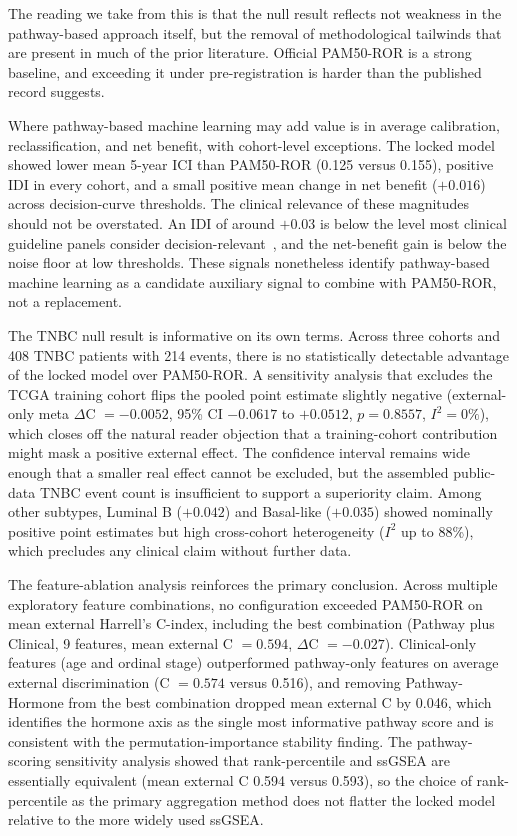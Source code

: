 \documentclass[11pt,letterpaper]{article}
\begin{document}
The reading we take from this is that the null result reflects not weakness in the pathway-based approach itself, but the removal of methodological tailwinds that are present in much of the prior literature. Official PAM50-ROR is a strong baseline, and exceeding it under pre-registration is harder than the published record suggests.

Where pathway-based machine learning may add value is in average calibration, reclassification, and net benefit, with cohort-level exceptions. The locked model showed lower mean 5-year ICI than PAM50-ROR (0.125 versus 0.155), positive IDI in every cohort, and a small positive mean change in net benefit ($+0.016$) across decision-curve thresholds. The clinical relevance of these magnitudes should not be overstated. An IDI of around $+0.03$ is below the level most clinical guideline panels consider decision-relevant~\cite{vickers2010traditional}, and the net-benefit gain is below the noise floor at low thresholds. These signals nonetheless identify pathway-based machine learning as a candidate auxiliary signal to combine with PAM50-ROR, not a replacement.

The TNBC null result is informative on its own terms. Across three cohorts and 408 TNBC patients with 214 events, there is no statistically detectable advantage of the locked model over PAM50-ROR. A sensitivity analysis that excludes the TCGA training cohort flips the pooled point estimate slightly negative (external-only meta $\Delta$C $= -0.0052$, 95\% CI $-0.0617$ to $+0.0512$, $p = 0.8557$, $I^2 = 0\%$), which closes off the natural reader objection that a training-cohort contribution might mask a positive external effect. The confidence interval remains wide enough that a smaller real effect cannot be excluded, but the assembled public-data TNBC event count is insufficient to support a superiority claim. Among other subtypes, Luminal B ($+0.042$) and Basal-like ($+0.035$) showed nominally positive point estimates but high cross-cohort heterogeneity ($I^2$ up to 88\%), which precludes any clinical claim without further data.

The feature-ablation analysis reinforces the primary conclusion. Across multiple exploratory feature combinations, no configuration exceeded PAM50-ROR on mean external Harrell's C-index, including the best combination (Pathway plus Clinical, 9 features, mean external C $= 0.594$, $\Delta$C $= -0.027$). Clinical-only features (age and ordinal stage) outperformed pathway-only features on average external discrimination (C $= 0.574$ versus 0.516), and removing Pathway-Hormone from the best combination dropped mean external C by 0.046, which identifies the hormone axis as the single most informative pathway score and is consistent with the permutation-importance stability finding. The pathway-scoring sensitivity analysis showed that rank-percentile and ssGSEA are essentially equivalent (mean external C 0.594 versus 0.593), so the choice of rank-percentile as the primary aggregation method does not flatter the locked model relative to the more widely used ssGSEA.
\end{document}
